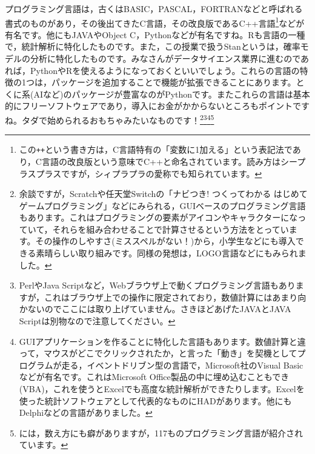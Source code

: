 \documentclass{ltjsbook}
\begin{document}
プログラミング言語は，古くはBASIC，PASCAL，FORTRANなどと呼ばれる書式のものがあり，その後出てきたC言語，その改良版であるC++言語\footnote{この\verb|++|という書き方は，C言語特有の「変数に1加える」という表記法であり，C言語の改良版という意味でC++と命名されています。読み方はシープラスプラスですが，シィプラプラの愛称でも知られています。}などが有名です。他にもJAVAやObject C，Pythonなどが有名ですね。Rも言語の一種で，統計解析に特化したものです。また，この授業で扱うStanというは，確率モデルの分析に特化したものです。みなさんがデータサイエンス業界に進むのであれば，PythonやRを使えるようになっておくといいでしょう。これらの言語の特徴の1つは，パッケージを追加することで機能が拡張できることにあります。とくに系(AIなど)のパッケージが豊富なのがPythonです。またこれらの言語は基本的にフリーソフトウェアであり，導入にお金がかからないところもポイントですね。タダで始められるおもちゃみたいなものです！\footnote{余談ですが，Scratchや任天堂Switchの「ナビつき! つくってわかる はじめてゲームプログラミング」などにみられる，GUIベースのプログラミング言語もあります。これはプログラミングの要素がアイコンやキャラクターになっていて，それらを組み合わせることで計算させるという方法をとっています。その操作のしやすさ(ミススペルがない！)から，小学生などにも導入できる素晴らしい取り組みです。同様の発想は，LOGO言語などにもみられました。}\footnote{PerlやJava Scriptなど，Webブラウザ上で動くプログラミング言語もありますが，これはブラウザ上での操作に限定されており，数値計算にはあまり向かないのでここには取り上げていません。さきほどあげたJAVAとJAVA Scriptは別物なので注意してください。}\footnote{GUIアプリケーションを作ることに特化した言語もあります。数値計算と違って，マウスがどこでクリックされたか，と言った「動き」を契機としてプログラムが走る，イベントドリブン型の言語で，Microsoft社のVisual Basicなどが有名です。これはMicrosoft Office製品の中に埋め込むこともでき(VBA)，これを使うとExcelでも高度な統計解析ができたりします。Excelを使った統計ソフトウェアとして代表的なものにHADがあります\textcite{HAD}。他にもDelphiなどの言語がありました。}\footnote{\textcite{Language2016}には，数え方にも癖がありますが，117ものプログラミング言語が紹介されています。}
\end{document}

